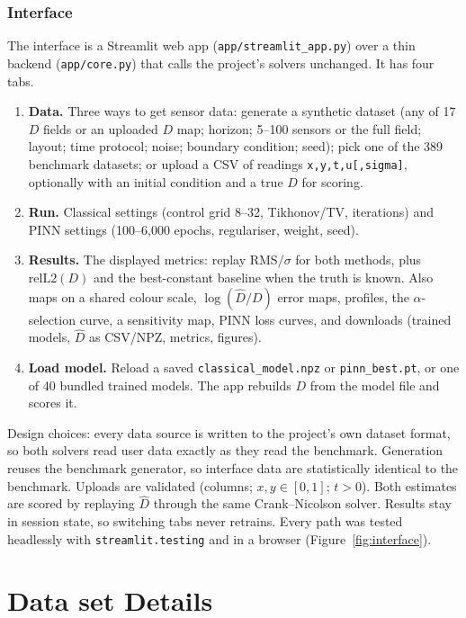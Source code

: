 \documentclass[twoside,english]{article}
\newcommand{\relL}{\mathrm{relL2}(D)}
\begin{document}
\subsubsection{Interface}
The interface is a Streamlit \citep{streamlit} web app (\texttt{app/streamlit\_app.py}) over a thin backend (\texttt{app/core.py}) that calls the project's solvers unchanged. It has four tabs.
\begin{enumerate}
\item \textbf{Data.} Three ways to get sensor data: generate a synthetic dataset (any of 17 $D$ fields or an uploaded $D$ map; horizon; 5--100 sensors or the full field; layout; time protocol; noise; boundary condition; seed); pick one of the 389 benchmark datasets; or upload a CSV of readings \texttt{x,y,t,u[,sigma]}, optionally with an initial condition and a true $D$ for scoring.
\item \textbf{Run.} Classical settings (control grid 8--32, Tikhonov/TV, iterations) and PINN settings (100--6{,}000 epochs, regulariser, weight, seed).
\item \textbf{Results.} The displayed metrics: replay RMS$/\sigma$ for both methods, plus $\relL$ and the best-constant baseline when the truth is known. Also maps on a shared colour scale, $\log(\hat D/D)$ error maps, profiles, the $\alpha$-selection curve, a sensitivity map, PINN loss curves, and downloads (trained models, $\hat D$ as CSV/NPZ, metrics, figures).
\item \textbf{Load model.} Reload a saved \texttt{classical\_model.npz} or \texttt{pinn\_best.pt}, or one of 40 bundled trained models. The app rebuilds $D$ from the model file and scores it.
\end{enumerate}
Design choices: every data source is written to the project's own dataset format, so both solvers read user data exactly as they read the benchmark. Generation reuses the benchmark generator, so interface data are statistically identical to the benchmark. Uploads are validated (columns; $x,y\in[0,1]$; $t>0$). Both estimates are scored by replaying $\hat D$ through the same Crank--Nicolson solver. Results stay in session state, so switching tabs never retrains. Every path was tested headlessly with \texttt{streamlit.testing} and in a browser (Figure~\ref{fig:interface}).

\section{Data set Details} \label{sec:data}
\end{document}
